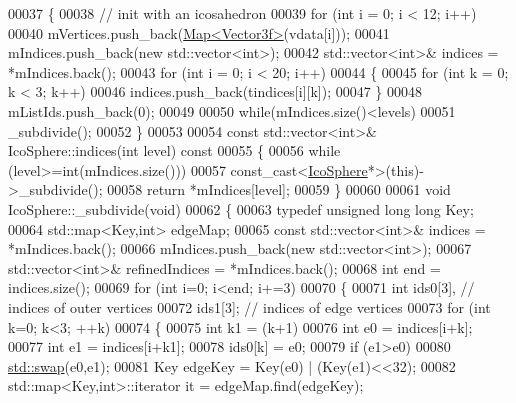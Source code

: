 \begin{DoxyCode}
00037 \{
00038   \textcolor{comment}{// init with an icosahedron}
00039   \textcolor{keywordflow}{for} (\textcolor{keywordtype}{int} i = 0; i < 12; i++)
00040     mVertices.push\_back(\hyperlink{group___core___module_class_eigen_1_1_map}{Map<Vector3f>}(vdata[i]));
00041   mIndices.push\_back(\textcolor{keyword}{new} std::vector<int>);
00042   std::vector<int>& indices = *mIndices.back();
00043   \textcolor{keywordflow}{for} (\textcolor{keywordtype}{int} i = 0; i < 20; i++)
00044   \{
00045     \textcolor{keywordflow}{for} (\textcolor{keywordtype}{int} k = 0; k < 3; k++)
00046       indices.push\_back(tindices[i][k]);
00047   \}
00048   mListIds.push\_back(0);
00049 
00050   \textcolor{keywordflow}{while}(mIndices.size()<levels)
00051     \_subdivide();
00052 \}
00053 
00054 \textcolor{keyword}{const} std::vector<int>& IcoSphere::indices(\textcolor{keywordtype}{int} level)\textcolor{keyword}{ const}
00055 \textcolor{keyword}{}\{
00056   \textcolor{keywordflow}{while} (level>=\textcolor{keywordtype}{int}(mIndices.size()))
00057     \textcolor{keyword}{const\_cast<}\hyperlink{class_ico_sphere}{IcoSphere}*\textcolor{keyword}{>}(\textcolor{keyword}{this})->\_subdivide();
00058   \textcolor{keywordflow}{return} *mIndices[level];
00059 \}
00060 
00061 \textcolor{keywordtype}{void} IcoSphere::\_subdivide(\textcolor{keywordtype}{void})
00062 \{
00063   \textcolor{keyword}{typedef} \textcolor{keywordtype}{unsigned} \textcolor{keywordtype}{long} \textcolor{keywordtype}{long} Key;
00064   std::map<Key,int> edgeMap;
00065   \textcolor{keyword}{const} std::vector<int>& indices = *mIndices.back();
00066   mIndices.push\_back(\textcolor{keyword}{new} std::vector<int>);
00067   std::vector<int>& refinedIndices = *mIndices.back();
00068   \textcolor{keywordtype}{int} end = indices.size();
00069   \textcolor{keywordflow}{for} (\textcolor{keywordtype}{int} i=0; i<end; i+=3)
00070   \{
00071     \textcolor{keywordtype}{int} ids0[3],  \textcolor{comment}{// indices of outer vertices}
00072         ids1[3];  \textcolor{comment}{// indices of edge vertices}
00073     \textcolor{keywordflow}{for} (\textcolor{keywordtype}{int} k=0; k<3; ++k)
00074     \{
00075       \textcolor{keywordtype}{int} k1 = (k+1)%
00076       \textcolor{keywordtype}{int} e0 = indices[i+k];
00077       \textcolor{keywordtype}{int} e1 = indices[i+k1];
00078       ids0[k] = e0;
00079       \textcolor{keywordflow}{if} (e1>e0)
00080         \hyperlink{endian_8c_a3ca5ecd34b04d6a243c054ac3a57f68d}{std::swap}(e0,e1);
00081       Key edgeKey = Key(e0) | (Key(e1)<<32);
00082       std::map<Key,int>::iterator it = edgeMap.find(edgeKey);

\end{DoxyCode}
